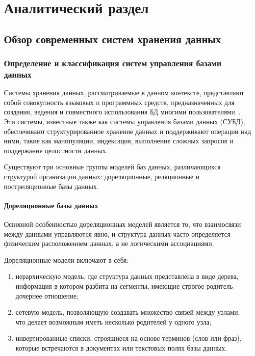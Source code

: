 \chapter{Аналитический раздел}

\section{Обзор современных систем хранения данных} 

\subsection{Определение и классификация систем управления базами данных}

Системы хранения данных, рассматриваемые в данном контексте, представляют собой совокупность языковых и программных средств, предназначенных для создания, ведения и совместного использования БД многими пользователями~\cite{database}.
Эти системы, известные также как системы управления базами данных (СУБД), обеспечивают структурированное хранение данных и поддерживают операции над ними, такие как манипуляции, индексация, выполнение сложных запросов и поддержание целостности данных. 

Существуют три основные группы моделей баз данных, различающихся структурой организации данных: дореляционные, реляционные и постреляционные базы данных.

\subsubsection{Дореляционные базы данных}

Основной особенностью дореляционных моделей является то, что взаимосвязи между данными управляются явно, и структура данных часто определяется физическим расположением данных, а не логическими ассоциациями.

Дореляционные модели включают в себя:

\begin{enumerate}[wide=12.5mm, leftmargin=12.5mm]
	\item иерархическую модель, где структура данных представлена в виде дерева, информация в котором разбита на сегменты, имеющие строгое родитель--дочернее отношение;
	\item сетевую модель, позволяющую создавать множество связей между узлами, что делает возможным иметь несколько родителей у одного узла;
	\item инвертированные списки, строящиеся на основе терминов (слов или фраз), которые встречаются в документах или текстовых полях базы данных.
\end{enumerate}

